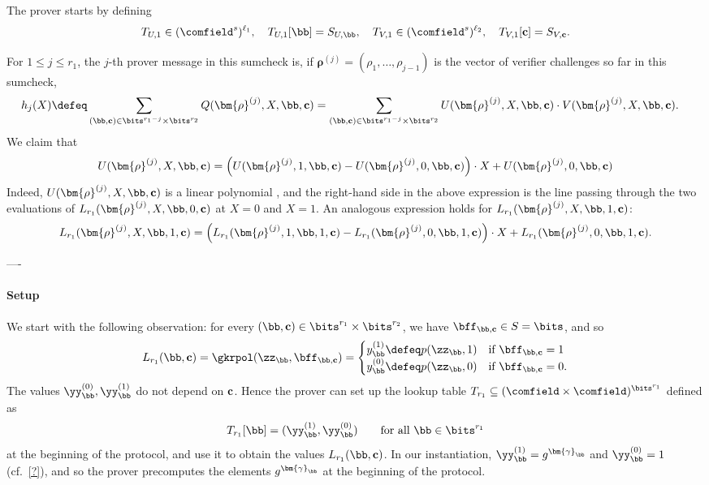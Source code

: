  The prover starts by defining
%
$$
T_{U, 1} \in (\comfield^{ s})^{\ell_1}, \quad T_{U,1}[\bb] = S_{U,\bb}, \quad 
T_{V, 1} \in (\comfield^{ s})^{\ell_2}, \quad T_{V,1}[\cc] = S_{V,\cc}.
$$

For $1\leq j\leq r_1$, the $j$-th prover message in this sumcheck is, if $\bm{\rho}^{(j)}=(\rho_1, \ldots, \rho_{j-1})$ is the vector of verifier challenges so far in this sumcheck,
%
\begin{align*}
h_j(X)&\defeq \sum_{(\bb,\cc)\in \bits^{r_1-j}\times \bits^{r_2}}Q(\bm{\rho}^{(j)}, X, \bb,\cc)=\sum_{(\bb,\cc)\in \bits^{r_1-j}\times \bits^{r_2}}U(\bm{\rho}^{(j)}, X, \bb,\cc)\cdot V(\bm{\rho}^{(j)}, X, \bb,\cc).
\end{align*}
%
We claim that
%
\begin{equation}\label{e:grand_product_Lr1}
U(\bm{\rho}^{(j)}, X, \bb,\cc) = \left(U(\bm{\rho}^{(j)}, 1, \bb,\cc) -  U(\bm{\rho}^{(j)}, 0, \bb,\cc)\right)\cdot X + U(\bm{\rho}^{(j)}, 0, \bb,\cc)
\end{equation}
Indeed, $U(\bm{\rho}^{(j)}, X, \bb,\cc)$ is a linear polynomial , and the right-hand side in the above expression is the line passing through the two evaluations of  $L_{r_1}(\bm{\rho}^{(j)}, X, \bb,0,\cc)$ at $X=0$ and $X=1$. An analogous expression holds for $L_{r_1}(\bm{\rho}^{(j)}, X, \bb, 1, \cc)$:
$$
L_{r_1}(\bm{\rho}^{(j)}, X, \bb,1,\cc) = \left(L_{r_1}(\bm{\rho}^{(j)}, 1, \bb,1,\cc) -  L_{r_1}(\bm{\rho}^{(j)}, 0, \bb,1,\cc)\right)\cdot X + L_{r_1}(\bm{\rho}^{(j)}, 0, \bb,1,\cc).
$$


 
----


\paragraph{Setup} We start with the following observation: for every $(\bb,\cc)\in \bits^{r_1} \times \bits^{r_2}$, we have $\bff_{\bb,\cc}\in S=\bits$, and so 
%
$$L_{r_1}(\bb,\cc)=\gkrpol(\zz_{\bb}, \bff_{\bb,\cc})= 
\begin{cases}
    y_{\bb}^{(1)}\defeq p(\zz_{\bb},1) & \text{if } \bff_{\bb,\cc}=1\\
     y_{\bb}^{(0)}\defeq p(\zz_{\bb},0) & \text{if } \bff_{\bb,\cc}=0.
\end{cases}$$
%
The values $\yy_{\bb}^{(0)}, \yy_{\bb}^{(1)}$   do not depend on $\mathbf{c}$. Hence the prover can set up the lookup table $T_{r_1}\subseteq (\comfield\times \comfield)^{\bits^{r_1}}$ defined as
%
$$
T_{r_1}[\bb]= (\yy_{\bb}^{(1)}, \yy_{\bb}^{(0)}) \qquad \text{for all } \bb \in \bits^{r_1}
$$
at the beginning of the protocol, and use it to obtain the values $L_{r_1}(\bb,\cc)$. %
In our instantiation, $\yy_{\bb}^{(1)}=g^{\bm{\gamma}_{\bb}}$ and $\yy_\bb^{(0)}=1$ (cf.\ \cref{?}), and so the prover precomputes the elements $g^{\bm{\gamma}_{\bb}}$ at the beginning of the protocol. 


